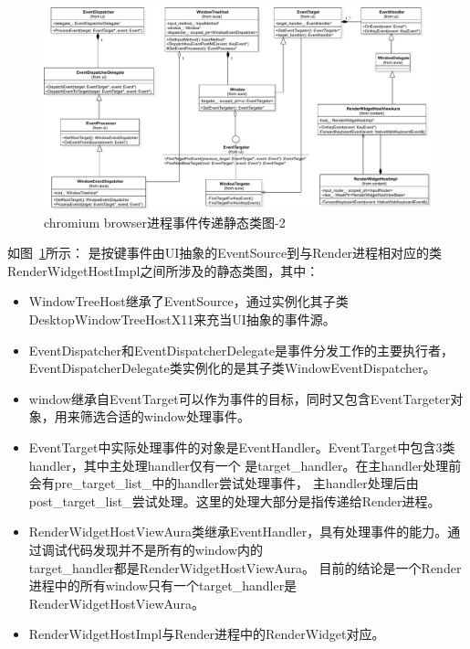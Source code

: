
\begin{figure}[H] 
  \centering 
  \includegraphics[width=\textwidth]{image/event_study/browser_event_dispatch_class_2.pdf} 
  \caption{chromium browser进程事件传递静态类图-2} \label{fig:linux_event_dispatch_class_2} 
\end{figure}

如图~\ref{fig:linux_event_dispatch_class_2}所示：
是按键事件由UI抽象的EventSource到与Render进程相对应的类RenderWidgetHostImpl之间所涉及的静态类图，其中：
\begin{itemize}
  \item WindowTreeHost继承了EventSource，通过实例化其子类DesktopWindowTreeHostX11来充当UI抽象的事件源。
  \item EventDispatcher和EventDispatcherDelegate是事件分发工作的主要执行者，
  EventDispatcherDelegate类实例化的是其子类WindowEventDispatcher。
  \item window继承自EventTarget可以作为事件的目标，同时又包含EventTargeter对象，用来筛选合适的window处理事件。
  \item EventTarget中实际处理事件的对象是EventHandler。EventTarget中包含3类handler，其中主处理handler仅有一个
  是target\_handler。在主handler处理前会有pre\_target\_list\_中的handler尝试处理事件，
  主handler处理后由post\_target\_list\_尝试处理。这里的处理大部分是指传递给Render进程。
  \item RenderWidgetHostViewAura类继承EventHandler，具有处理事件的能力。通过调试代码发现并不是所有的window内的\\
  target\_handler都是RenderWidgetHostViewAura。
  目前的结论是一个Render进程中的所有window只有一个target\_handler是RenderWidgetHostViewAura。
  \item RenderWidgetHostImpl与Render进程中的RenderWidget对应。
\end{itemize}

